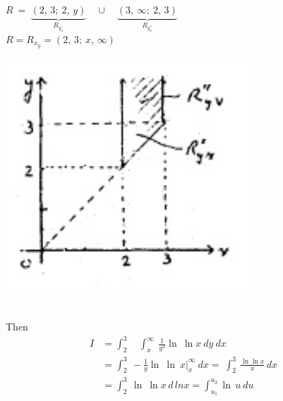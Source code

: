 \documentclass{amsbook}
\begin{document}
    \begin{minipage}[c]{0.45\textwidth}
             $ R \ =\: \underbrace{(2,\, 3;\: 2,\, y)}_\text{$R_y_x^{'}$} \quad \cup \quad \underbrace{(3,\, \infty;\: 2,\, 3)}_\text{$R_y_x^{''}$} $ \\
    
            $R = R_x_y = (2, \, 3;\: x,\, \infty)$
    \end{minipage}
    \hfill
    \begin{minipage}[c]{0.45\textwidth}
            \includegraphics[width=0.7\textwidth]{images/b2p2-387-fig01.jpg}
    \end{minipage}\\
    
    Then 
    \begin{align*}
         I &= \int_{2}^{3} \quad \int_{x}^{\infty} \ \frac{1}{y^{2}} \ln \ \ln x \: dy \: dx \\ 
         &= \int_{2}^{3}  \ -\frac{1}{y} \ln \ \ln \ x\big|_{x}^{\infty} \: dx = \ \int_{2}^{3}  \ \frac{\ln \ln x}{x} \, dx \\
        &= \int_{2}^{3}  \ \ln \ \ln x \, d \, ln  x = \int_{u_1}^{u_2} \ln \,u \ du    
    \end{align*}
    
    
    
    
    
\end{document}
